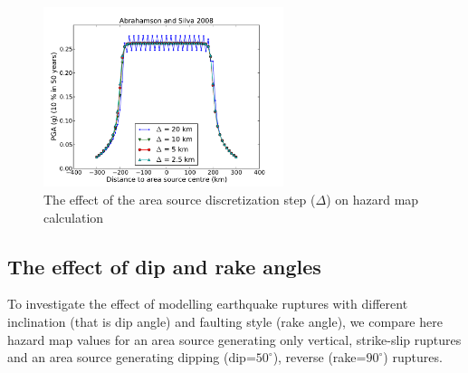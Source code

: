 \begin{figure}
\includegraphics[width=7cm]{./Pictures/PGA_0pt1_source_model_a5_AS2008.pdf}
\caption{The effect of the area source discretization step ($\Delta$) on hazard map calculation}
\label{fig:delta_area}
\end{figure}

\subsection{The effect of dip and rake angles}
To investigate the effect of modelling earthquake ruptures with different inclination (that is dip angle) and
faulting style (rake angle), we compare here hazard map values for an area source generating only vertical,
strike-slip ruptures and an area source generating dipping (dip=$50^{\circ}$), reverse (rake=$90^{\circ}$) ruptures.

